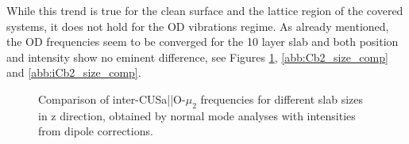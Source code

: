 \documentclass[11pt,DIV=13,BCOR=5mm,a4paper,headinclude]{scrbook}
\begin{document}
While this trend is true for the clean surface and the lattice region of the covered systems, it does not hold for the OD vibrations regime.
As already mentioned, the OD frequencies seem to be converged for the 10 layer slab and both position and intensity show no eminent difference, see Figures \ref{abb:iCa2_size_comp}, \ref{abb:Cb2_size_comp} and \ref{abb:iCb2_size_comp}.
\begin{figure}[!h]
    \centering
             \quad
             \quad
             \caption{Comparison of inter-CUSa||O-$\mu_2$ frequencies for different slab sizes in z direction, obtained by normal mode analyses with intensities from dipole corrections.}
            \label{abb:iCa2_size_comp}
\end{figure}
\end{document}
